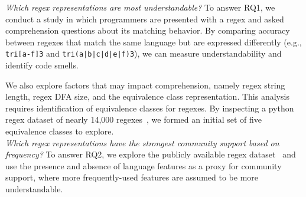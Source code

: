%
%

 {\em Which regex representations are most understandable?}
To answer RQ1, we conduct a study in which programmers are presented with a regex and asked comprehension questions about its matching behavior. By comparing accuracy between regexes that match the same language but are expressed differently (e.g., \verb!tri[a-f]3! and \verb!tri(a|b|c|d|e|f)3!), we can measure understandability and identify code smells.

We also explore factors that may impact comprehension, namely regex string length, regex DFA size, and the equivalence class representation.
This analysis requires identification of equivalence classes for regexes. By inspecting a python regex dataset of nearly 14,000 regexes~\cite{chapman2016}, we formed an initial set of five equivalence classes to explore. \\

 {\em Which regex representations have the strongest {community support} based on frequency?} %
To answer RQ2, we explore the publicly available regex dataset~\cite{chapman2016} and use the presence and absence of language features as a proxy for community support, where more frequently-used features are assumed to be more understandable.\\

